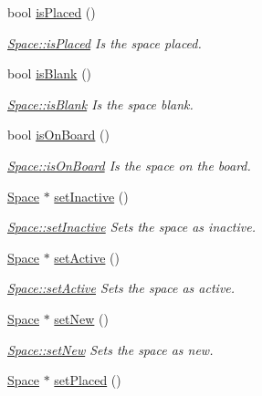 \begin{DoxyCompactItemize}
bool \hyperlink{class_space_a6aa96af44b69e725c4891ad83be05dbd}{is\-Placed} ()
\begin{DoxyCompactList}\small\item\em \hyperlink{class_space_a6aa96af44b69e725c4891ad83be05dbd}{Space\-::is\-Placed} Is the space placed. \end{DoxyCompactList}\item 
bool \hyperlink{class_space_a308f0ef400183df78df69717ca50cfee}{is\-Blank} ()
\begin{DoxyCompactList}\small\item\em \hyperlink{class_space_a308f0ef400183df78df69717ca50cfee}{Space\-::is\-Blank} Is the space blank. \end{DoxyCompactList}\item 
bool \hyperlink{class_space_a5af5885e0b62f4d13ed32c86e50f3cfe}{is\-On\-Board} ()
\begin{DoxyCompactList}\small\item\em \hyperlink{class_space_a5af5885e0b62f4d13ed32c86e50f3cfe}{Space\-::is\-On\-Board} Is the space on the board. \end{DoxyCompactList}\item 
\hyperlink{class_space}{Space} $\ast$ \hyperlink{class_space_a8f6b89f570c1e0ca3c34f19df439a598}{set\-Inactive} ()
\begin{DoxyCompactList}\small\item\em \hyperlink{class_space_a8f6b89f570c1e0ca3c34f19df439a598}{Space\-::set\-Inactive} Sets the space as inactive. \end{DoxyCompactList}\item 
\hyperlink{class_space}{Space} $\ast$ \hyperlink{class_space_aeca3474bbee2025962d100b1e60792d5}{set\-Active} ()
\begin{DoxyCompactList}\small\item\em \hyperlink{class_space_aeca3474bbee2025962d100b1e60792d5}{Space\-::set\-Active} Sets the space as active. \end{DoxyCompactList}\item 
\hyperlink{class_space}{Space} $\ast$ \hyperlink{class_space_a3afac453f54e569a94164c41a9721643}{set\-New} ()
\begin{DoxyCompactList}\small\item\em \hyperlink{class_space_a3afac453f54e569a94164c41a9721643}{Space\-::set\-New} Sets the space as new. \end{DoxyCompactList}\item 
\hyperlink{class_space}{Space} $\ast$ \hyperlink{class_space_a092351d8c32b8f89a78fc475a49b3b21}{set\-Placed} ()

\end{DoxyCompactItemize}
